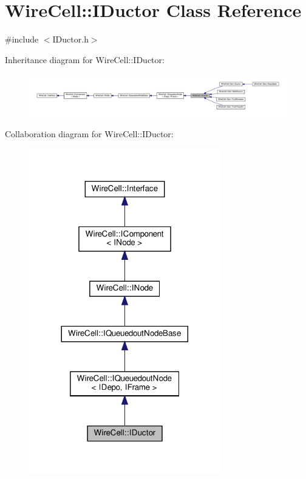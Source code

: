 \hypertarget{class_wire_cell_1_1_i_ductor}{}\section{Wire\+Cell\+:\+:I\+Ductor Class Reference}
\label{class_wire_cell_1_1_i_ductor}


{\ttfamily \#include $<$I\+Ductor.\+h$>$}



Inheritance diagram for Wire\+Cell\+:\+:I\+Ductor\+:
\nopagebreak
\begin{figure}[H]
\begin{center}
\leavevmode
\includegraphics[width=350pt]{class_wire_cell_1_1_i_ductor__inherit__graph}
\end{center}
\end{figure}


Collaboration diagram for Wire\+Cell\+:\+:I\+Ductor\+:
\nopagebreak
\begin{figure}[H]
\begin{center}
\leavevmode
\includegraphics[width=236pt]{class_wire_cell_1_1_i_ductor__coll__graph}
\end{center}
\end{figure}
